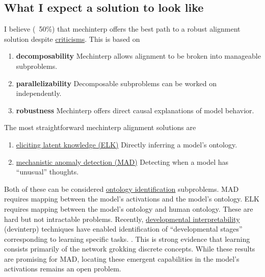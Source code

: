 \subsection{What I expect a solution to look like}
I believe (~50\%) that mechinterp offers the best path to a robust alignment solution despite
\hyperlink{https://www.lesswrong.com/posts/tEPHGZAb63dfq2v8n/how-useful-is-mechanistic-interpretability}{criticisms}.
This is based on 
\begin{enumerate}
    \item \textbf{decomposability} Mechinterp allows alignment to be broken into manageable subproblems.
    \item \textbf{parallelizability} Decomposable subproblems can be worked on independently.
    \item \textbf{robustness} Mechinterp offers direct causal explanations of model behavior.
\end{enumerate}
The most straightforward mechinterp alignment solutions are
\begin{enumerate}
    \item \hyperlink{https://www.alignment.org/blog/arcs-first-technical-report-eliciting-latent-knowledge/}{eliciting latent knowledge (ELK)} 
    Directly inferring a model's ontology.
    \label{it:elk}
    \item \hyperlink{https://www.alignment.org/blog/mechanistic-anomaly-detection-and-elk/}{mechanistic anomaly detection (MAD)} 
    Detecting when a model has ``unusual'' thoughts.
    \label{it:mad}
\end{enumerate}
Both of these can be considered 
\hyperlink{https://arbital.greaterwrong.com/p/ontology_identification/}{ontology identification}
subproblems. 
MAD requires mapping between the model's activations and the model's ontology.
ELK requires mapping between the model's ontology and human ontology.
These are hard but not intractable problems.
Recently, \hyperlink{https://devinterp.com/}{developmental interpretability} 
(devinterp) techniques have enabled identification of ``developmental stages'' 
corresponding to learning specific tasks.
\cite{hoogland2024developmental}.
This is strong evidence that learning consists primarily of the network
grokking\cite{nanda2023progress} discrete concepts.
While these results are promising for MAD, 
locating these emergent capabilities in the model's activations remains an open problem.



